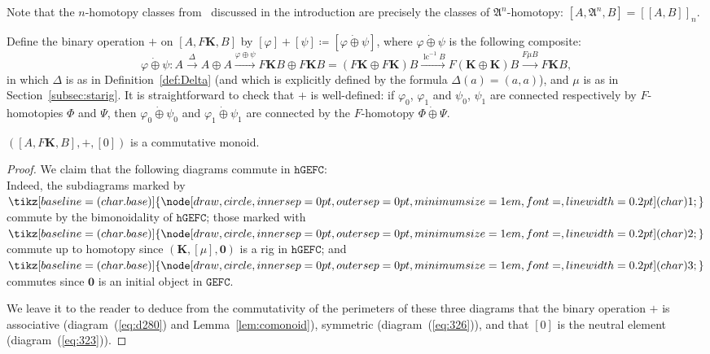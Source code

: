 \documentclass[10pt]{simplearticle}
\newcommand{\tikzinput}[1]{}
\newcommand{\tcbase}[1]{%
  \mathord{%
    \tikz[baseline=(char.base)]{
      \node[draw,circle,inner sep=0pt,outer sep=0pt,minimum size=1em,font=\small,line width=0.2pt] (char) {#1};
    }%
  }%
}
\newcommand{\GEFC}{\mathbb{\mathtt{GEFC}}}
\newcommand{\hGEFC}{\mathtt{hGEFC}}
\newcommand{\tc}[1]{\tcbase{#1}}
\newcommand{\uu}{\dot{\oplus}}
\newcommand{\bzero}{\boldsymbol{0}}
\newcommand{\lc}{\operatorname{lc}}
\newcommand{\fK}{\mathbf{K}}
\newcommand{\myllbracket}{[[}
\newcommand{\myrrbracket}{]]}
\newcommand{\bbrackets}[1]{\myllbracket#1\myrrbracket}
\begin{document}
\begin{rem}
Note that the $n$-homotopy classes from~\cite{GHT} discussed in
the introduction are precisely the classes of $\mathfrak{A}^{n}$-homotopy:
$[A,\mathfrak{A}^{n},B]=\bbrackets{A,B}_{n}$.
\end{rem}

\begin{defn}\label{def:53}
Define the binary operation $+$ on $[A,F\fK,B]$ by
$[\varphi]+[\psi]\coloneqq[\varphi\uu\psi]$, where $\varphi\uu\psi$
is the following composite:
\[
\varphi\uu\psi\colon A\xrightarrow{\Delta}A\oplus A\xrightarrow{\varphi\oplus\psi}F\fK B\oplus F\fK B=(F\fK\oplus F\fK)B\xrightarrow{\lc^{-1}B}F(\fK\oplus\fK)B\xrightarrow{F\mu B}F\fK B,
\]
in which $\Delta$ is as in Definition~\ref{def:Delta} (and which
is explicitly defined by the formula $\Delta(a)=(a,a)$), and $\mu$
is as in Section~\ref{subsec:starig}. It is straightforward to check
that $+$ is well-defined: if $\varphi_{0}$, $\varphi_{1}$ and $\psi_{0}$,
$\psi_{1}$ are connected respectively by $F$-homotopies $\Phi$
and $\Psi$, then $\varphi_{0}\uu\psi_{0}$ and $\varphi_{1}\uu\psi_{1}$
are connected by the $F$-homotopy $\Phi\uu\Psi$.
\end{defn}

\begin{prop}
$([A,F\fK,B],+,[0])$ is a commutative monoid.
\end{prop}

\begin{proof}
We claim that the following diagrams commute in $\hGEFC$:
\begin{equation}
\tikzinput{d492}\label{eq:d280}
\end{equation}
\begin{equation}
\tikzinput{d326}\label{eq:326}
\end{equation}
\begin{equation}
\tikzinput{d323}\label{eq:323}
\end{equation}
Indeed, the subdiagrams marked by $\tc 1$ commute by the bimonoidality
of $\hGEFC$; those marked with $\tc 2$ commute up to homotopy since
$(\fK,[\mu],\bzero)$ is a rig in $\hGEFC$; and $\tc 3$ commutes
since $\bzero$ is an initial object in $\GEFC$.

We leave it to the reader to deduce from the commutativity of the
perimeters of these three diagrams that the binary operation $+$
is associative (diagram~(\ref{eq:d280}) and Lemma~\ref{lem:comonoid}),
symmetric (diagram~(\ref{eq:326})), and that $[0]$ is the neutral
element (diagram~(\ref{eq:323})).
\end{proof}
\end{document}
